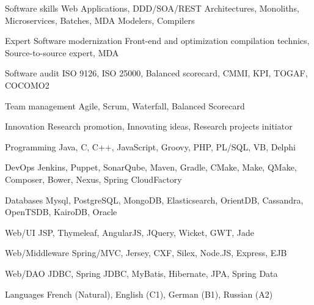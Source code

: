 

\begin{cvskills}

  \cvskill
  {Software skills} %
  {Web Applications, DDD/SOA/REST Architectures, Monoliths, Microservices, Batches, MDA Modelers, Compilers} %


  \cvskill
  {Expert Software modernization} %
  {Front-end and optimization compilation technics, Source-to-source expert, MDA} %


  \cvskill
  {Software audit} %
  {ISO 9126, ISO 25000, Balanced scorecard, CMMI, KPI, TOGAF, COCOMO2} %

  \cvskill
  {Team management} %
  {Agile, Scrum, Waterfall, Balanced Scorecard} %

  \cvskill
  {Innovation} %
  {Research promotion, Innovating ideas, Research projects initiator} %

  \cvskill
  {Programming} %
  {Java, C, C++, JavaScript, Groovy, PHP, PL/SQL, VB, Delphi} %
  
  \cvskill
  {DevOps} %
  {Jenkins, Puppet, SonarQube, Maven, Gradle, CMake, Make, QMake, Composer, Bower, Nexus, Spring CloudFactory} %
  
  \cvskill
  {Databases} %
  {Mysql, PostgreSQL, MongoDB, Elasticsearch, OrientDB, Cassandra, OpenTSDB, KairoDB, Oracle} %
  
  \cvskill
  {Web/UI} %
  {JSP, Thymeleaf, AngularJS, JQuery, Wicket, GWT, Jade} %
  
  \cvskill
  {Web/Middleware} %
  {Spring/MVC, Jersey, CXF, Silex, Node.JS, Express, EJB} %
  
  
  \cvskill
  {Web/DAO} %
  {JDBC, Spring JDBC, MyBatis, Hibernate, JPA, Spring Data} %
  

  \cvskill
    {Languages} %
    {French (Natural), English (C1), German (B1), Russian (A2)} %

\end{cvskills}
